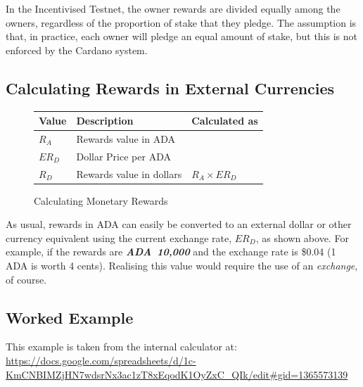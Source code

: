 \documentclass[11pt,a4paper,dvipsnames,twosided,final]{article}
\newcommand{\ada}{ADA{}}
\newcommand{\ADA}[1]{\textbf{\emph{\ada~{#1}}}}
\newcommand{\cardano}[1]{Cardano}
\begin{document}
\noindent
In the Incentivised Testnet, the owner rewards are divided equally among the
owners, regardless of the proportion of stake that they pledge.  The assumption
is that, in practice, each owner will pledge an equal amount of stake, but this
is not enforced by the \cardano{} system.

\clearpage
\subsection{Calculating Rewards in External Currencies}
\label{sec:conversion}

\begin{figure}[h!]
\begin{center}
\begin{tabular}{||l|p{6cm}|l||}
  \hline \hline
\textbf{Value} & \textbf{Description} & \textbf{Calculated as} \\\hline
$R_A$ &  Rewards value in \ada{} &\\\hline
$ER_D$ &  Dollar Price per \ada{} &\\\hline
$R_D$ &  Rewards value in dollars & $R_A \times ER_D$ \\\hline
\hline
\end{tabular}
\end{center}
\caption{Calculating Monetary Rewards}
\label{fig:monetary}
\end{figure}

\noindent
As usual, rewards in \ada{} can easily be converted to an external dollar or other currency equivalent using
the current exchange rate, $ER_D$, as shown %
above.  For example, if the rewards are \ADA{10,000} and the exchange rate is
\$0.04 (1 \ada{} is worth 4 cents).  Realising this value would require the use of an \emph{exchange},
of course.

\clearpage
\subsection{Worked Example}


This example is taken from the \IOHK{} internal calculator at:
\url{https://docs.google.com/spreadsheets/d/1c-KmCNBIMZjHN7wdsrNx3ac1zT8xEqodK1OyZxC_QIk/edit#gid=1365573139}
\end{document}
